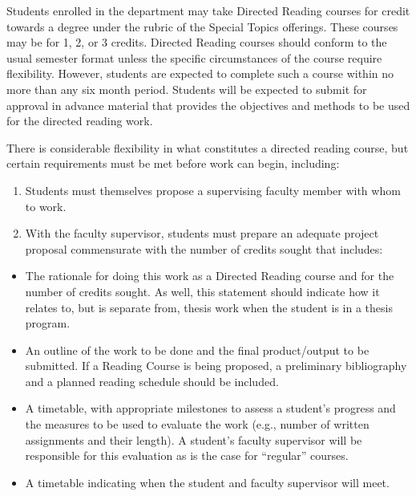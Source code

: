 \documentclass[
]{book}
\begin{document}
Students enrolled in the department may take Directed Reading courses for credit towards a degree under the rubric of the Special Topics offerings. These courses may be for 1, 2, or 3 credits. Directed Reading courses should conform to the usual semester format unless the specific circumstances of the course require flexibility. However, students are expected to complete such a course within no more than any six month period. Students will be expected to submit for approval in advance material that provides the objectives and methods to be used for the directed reading work.

There is considerable flexibility in what constitutes a directed reading course, but certain requirements must be met before work can begin, including:

\begin{enumerate}
\def\labelenumi{\arabic{enumi}.}
\item
  Students must themselves propose a supervising faculty member with whom to work.
\item
  With the faculty supervisor, students must prepare an adequate project proposal commensurate with the number of credits sought that includes:
\end{enumerate}

\begin{itemize}
\item
  The rationale for doing this work as a Directed Reading course and for the number of credits sought. As well, this statement should indicate how it relates to, but is separate from, thesis work when the student is in a thesis program.
\item
  An outline of the work to be done and the final product/output to be submitted. If a Reading Course is being proposed, a preliminary bibliography and a planned reading schedule should be included.
\item
  A timetable, with appropriate milestones to assess a student's progress and the measures to be used to evaluate the work (e.g., number of written assignments and their length). A student's faculty supervisor will be responsible for this evaluation as is the case for ``regular'' courses.
\item
  A timetable indicating when the student and faculty supervisor will meet.
\end{itemize}
\end{document}
